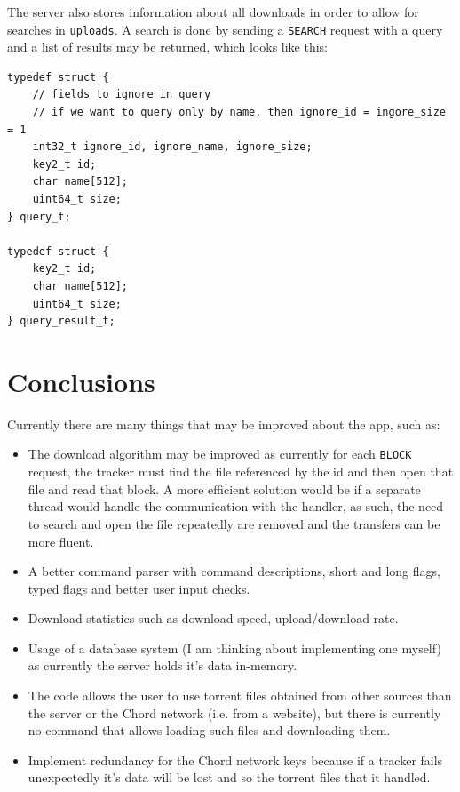 \documentclass[runningheads]{llncs}
\begin{document}
The server also stores information about all downloads in order to allow for searches in \verb|uploads|. A search is done by sending a \verb|SEARCH| request with a query and a list of results may be returned, which looks like this:
\begin{lstlisting}
typedef struct {
    // fields to ignore in query
    // if we want to query only by name, then ignore_id = ingore_size = 1
    int32_t ignore_id, ignore_name, ignore_size;
    key2_t id;
    char name[512];
    uint64_t size;
} query_t;

typedef struct {
    key2_t id;
    char name[512];
    uint64_t size;
} query_result_t;
\end{lstlisting}

\section{Conclusions} \label{conclusions}
Currently there are many things that may be improved about the app, such as:
\begin{itemize}
    \item The download algorithm may be improved as currently for each \verb|BLOCK| request, the tracker must find the file referenced by the id and then open that file and read that block. A more efficient solution would be if a separate thread would handle the communication with the handler, as such, the need to search and open the file repeatedly are removed and the transfers can be more fluent.
    \item A better command parser with command descriptions, short and long flags, typed flags and better user input checks.
    \item Download statistics such as download speed, upload/download rate.
    \item Usage of a database system (I am thinking about implementing one myself) as currently the server holds it's data in-memory.
    \item The code allows the user to use torrent files obtained from other sources than the server or the Chord network (i.e. from a website), but there is currently no command that allows loading such files and downloading them.
    \item Implement redundancy for the Chord network keys because if a tracker fails unexpectedly it's data will be lost and so the torrent files that it handled.
\end{itemize}

\pagebreak
\end{document}
